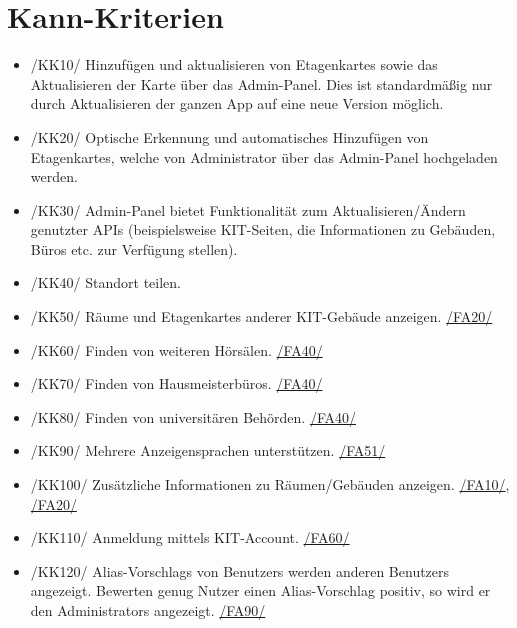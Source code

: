 \section{Kann-Kriterien}

\begin{itemize}

    \item{/KK10/} \label{/KK10/} Hinzufügen und aktualisieren von \Glspl{Etagenkarte} sowie das Aktualisieren der \Gls{Karte} über das \Gls{Admin-Panel}.
        Dies ist standardmäßig nur durch Aktualisieren der ganzen App auf eine neue Version möglich.
    \item{/KK20/} \label{/KK20/} Optische Erkennung und automatisches Hinzufügen von \Glspl{Etagenkarte},
          welche von \Gls{Administrator} über das \Gls{Admin-Panel} hochgeladen werden.
          
    \item{/KK30/} \label{/KK30/} \Gls{Admin-Panel} bietet Funktionalität zum Aktualisieren/Ändern genutzter \Gls{API}s (beispielsweise \Gls{KIT}-Seiten, die Informationen zu Gebäuden, Büros etc. zur Verfügung stellen).
    \item{/KK40/} \label{/KK40/} Standort teilen.
    \item{/KK50/} \label{/KK50/} Räume und \Glspl{Etagenkarte} anderer \Gls{KIT}-Gebäude anzeigen. \hyperref[/FA20/]{/FA20/}
    \item{/KK60/} \label{/KK60/} Finden von weiteren Hörsälen. \hyperref[/FA40/]{/FA40/}
    \item{/KK70/} \label{/KK70/} Finden von Hausmeisterbüros. \hyperref[/FA40/]{/FA40/}
    \item{/KK80/} \label{/KK80/} Finden von universitären Behörden. \hyperref[/FA40/]{/FA40/}
    \item{/KK90/} \label{/KK90/} Mehrere Anzeigensprachen unterstützen. \hyperref[/FA51/]{/FA51/}
    \item{/KK100/} \label{/KK100/} Zusätzliche Informationen zu Räumen/Gebäuden anzeigen. \hyperref[/FA10/]{/FA10/}, \hyperref[/FA20/]{/FA20/}
    \item{/KK110/} \label{/KK110/} Anmeldung mittels \Gls{KIT}-Account. \hyperref[/FA60/]{/FA60/}
    \item{/KK120/} \label{/KK120/} \Glspl{Alias-Vorschlag} von \Glspl{Benutzer} werden anderen \Glspl{Benutzer} angezeigt. Bewerten genug Nutzer einen 
    \Gls{Alias-Vorschlag} positiv, so wird er den \Glspl{Administrator} angezeigt. \hyperref[/FA90/]{/FA90/}
    
        

\end{itemize}
